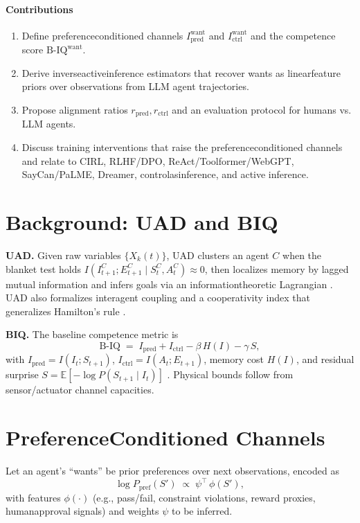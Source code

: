 \documentclass[11pt]{article}
\begin{document}
\paragraph{Contributions}
\begin{enumerate}[leftmargin=2em]
  \item Define preference\textendash conditioned channels $I^{\text{want}}_{\mathrm{pred}}$ and $I^{\text{want}}_{\mathrm{ctrl}}$ and the competence score $\mathrm{B\text{-}IQ}^{\text{want}}$.
  \item Derive inverse\textendash active\textendash inference estimators that recover wants as linear\textendash feature priors over observations from LLM agent trajectories.
  \item Propose alignment ratios $r_{\mathrm{pred}}, r_{\mathrm{ctrl}}$ and an evaluation protocol for humans vs. LLM agents.
  \item Discuss training interventions that raise the preference\textendash conditioned channels and relate to CIRL, RLHF/DPO, ReAct/Toolformer/WebGPT, SayCan/PaLM\textendash E, Dreamer, control\textendash as\textendash inference, and active inference.
\end{enumerate}

\section{Background: UAD and B\textendash IQ}
\label{sec:background}
\textbf{UAD.} Given raw variables $\{X_k(t)\}$, UAD clusters an agent $C$ when the blanket test holds
$ I(I^C_{t+1}; E^C_{t+1} \mid S^C_t, A^C_t) \approx 0 $, then localizes memory by lagged mutual information and infers goals via an information\textendash theoretic Lagrangian \citep{ZarnckeUAD}. UAD also formalizes inter\textendash agent coupling and a cooperativity index that generalizes Hamilton's rule \citep{ZarnckeUAD, ZarnckeAttractors}.

\textbf{B\textendash IQ.} The baseline competence metric is
\begin{equation}
\mathrm{B\text{-}IQ} \;=\; I_{\mathrm{pred}} + I_{\mathrm{ctrl}} - \beta\,H(I) - \gamma\,S,
\end{equation}
with $I_{\mathrm{pred}}=I(I_t; S_{t+1})$, $I_{\mathrm{ctrl}}=I(A_t; E_{t+1})$, memory cost $H(I)$, and residual surprise $S=\mathbb E[-\log P(S_{t+1}\mid I_t)]$ \citep{ZarnckeBIQ}. Physical bounds follow from sensor/actuator channel capacities.

\section{Preference\textendash Conditioned Channels}
\label{sec:pc}
Let an agent's ``wants'' be prior preferences over next observations, encoded as
\begin{equation}
\log P_{\mathrm{pref}}(S') \;\propto\; \psi^\top\,\phi(S'),
\end{equation}
with features $\phi(\cdot)$ (e.g., pass/fail, constraint violations, reward proxies, human\textendash approval signals) and weights $\psi$ to be inferred.
\end{document}
